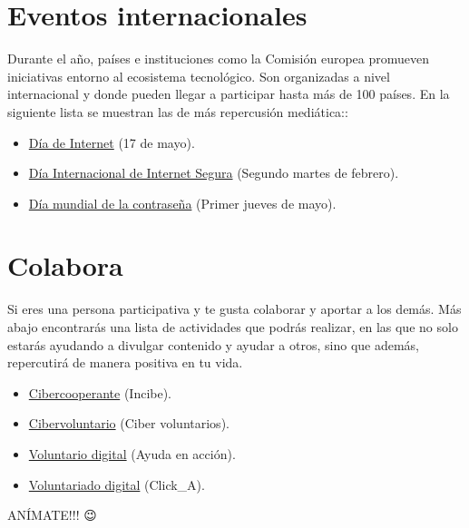\documentclass[
  spanish,
  a4paper,
  openany]{book}
\begin{document}
\hypertarget{eventos-internacionales}{%
\section{Eventos internacionales}\label{eventos-internacionales}}

Durante el año, países e instituciones como la Comisión europea promueven iniciativas entorno al ecosistema tecnológico. Son organizadas a nivel internacional y donde pueden llegar a participar hasta más de 100 países. En la siguiente lista se muestran las de más repercusión mediática::

\begin{itemize}
\item
  \href{https://es.wikipedia.org/wiki/Día_de_Internet}{Día de Internet} (17 de mayo).
\item
  \href{https://es.wikipedia.org/wiki/Día_Internacional_de_Internet_Segura}{Día Internacional de Internet Segura} (Segundo martes de febrero).
\item
  \href{https://es.wikipedia.org/wiki/Día_mundial_de_la_contraseña}{Día mundial de la contraseña} (Primer jueves de mayo).
\end{itemize}

\hypertarget{colabora}{%
\section{Colabora}\label{colabora}}

Si eres una persona participativa y te gusta colaborar y aportar a los demás. Más abajo encontrarás una lista de actividades que podrás realizar, en las que no solo estarás ayudando a divulgar contenido y ayudar a otros, sino que además, repercutirá de manera positiva en tu vida.

\begin{itemize}
\item
  \href{https://www.incibe.es/cibercooperantes/quiero-ser-cibercooperante}{Cibercooperante} (Incibe).
\item
  \href{https://www.cibervoluntarios.org/}{Cibervoluntario} (Ciber voluntarios).
\item
  \href{https://ayudaenaccion.org/ong/colabora/voluntariado-digital/}{Voluntario digital} (Ayuda en acción).
\item
  \href{https://twitter.com/Clicka_CRE}{Voluntariado digital} (Click\_A).
\end{itemize}

ANÍMATE!!! 😉
\end{document}
